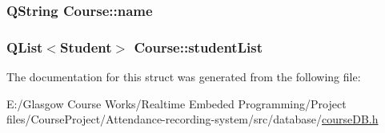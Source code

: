 \subsubsection[{name}]{\setlength{\rightskip}{0pt plus 5cm}Q\+String Course\+::name}\label{struct_course_a5d2a6f03014a6fe1f104a75f1eb31c4e}
\hypertarget{struct_course_a0f6bc505366d201dc2155eb73004c3af}{}
\subsubsection[{student\+List}]{\setlength{\rightskip}{0pt plus 5cm}Q\+List$<${\bf Student}$>$ Course\+::student\+List}\label{struct_course_a0f6bc505366d201dc2155eb73004c3af}


The documentation for this struct was generated from the following file\+:\begin{DoxyCompactItemize}
\item 
E\+:/\+Glasgow Course Works/\+Realtime Embeded Programming/\+Project files/\+Course\+Project/\+Attendance-\/recording-\/system/src/database/\hyperlink{course_d_b_8h}{course\+D\+B.\+h}\end{DoxyCompactItemize}
